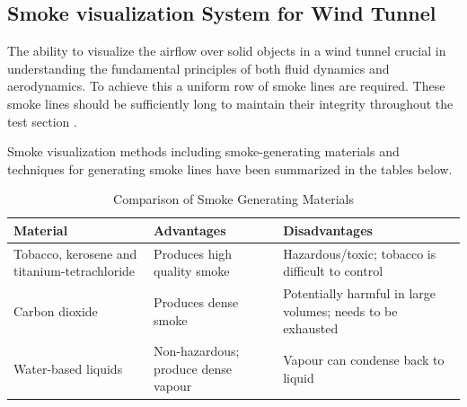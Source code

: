 \subsection{Smoke visualization System for Wind Tunnel}
The ability to visualize the airflow over solid objects in a wind tunnel crucial in understanding the fundamental principles of both fluid dynamics and aerodynamics. To achieve this a uniform row of smoke lines are required. These smoke lines should be sufficiently long to maintain their integrity throughout
the test section \cite{trinder2013development}.

Smoke visualization methods including smoke-generating materials and techniques for generating smoke lines have been summarized in the tables below.
\begin{center}
	\begin{table}[H]
		\caption[Smoke Generating Materials]{Comparison of Smoke Generating Materials}
	
	\begin{tabular}{|p{5cm}|p{5cm}|p{5cm}|}
		\hline
		\textbf{Material}                            & \textbf{Advantages}                 & \textbf{Disadvantages}                                      \\
		\hline
		Tobacco, kerosene and titanium-tetrachloride & Produces high quality smoke         & Hazardous/toxic; tobacco is difficult to control           \\
		\hline
		Carbon dioxide                               & Produces dense smoke                & Potentially harmful in large volumes; needs to be exhausted \\
		\hline
		Water-based liquids                          & Non-hazardous; produce dense vapour & Vapour can condense back to liquid                          \\
		\hline
	\end{tabular}
\end{table}
\end{center}

